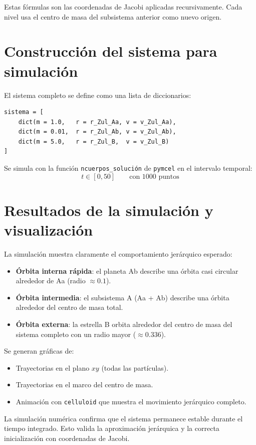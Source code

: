 \begin{importante}
Estas fórmulas son las coordenadas de Jacobi aplicadas recursivamente. Cada nivel usa el centro de masa del subsistema anterior como nuevo origen.
\end{importante}

\section{Construcción del sistema para simulación}
El sistema completo se define como una lista de diccionarios:
\begin{lstlisting}
sistema = [
    dict(m = 1.0,   r = r_Zul_Aa, v = v_Zul_Aa),
    dict(m = 0.01,  r = r_Zul_Ab, v = v_Zul_Ab),
    dict(m = 5.0,   r = r_Zul_B,  v = v_Zul_B)
]
\end{lstlisting}

Se simula con la función \texttt{ncuerpos\_solución} de \texttt{pymcel} en el intervalo temporal:
\[
t \in [0, 50]\qquad \text{con 1000 puntos}
\]

\section{Resultados de la simulación y visualización}
La simulación muestra claramente el comportamiento jerárquico esperado:
\begin{itemize}
    \item \textbf{Órbita interna rápida}: el planeta Ab describe una órbita casi circular alrededor de Aa (radio \(\approx 0.1\)).
    \item \textbf{Órbita intermedia}: el subsistema A (Aa + Ab) describe una órbita alrededor del centro de masa total.
    \item \textbf{Órbita externa}: la estrella B orbita alrededor del centro de masa del sistema completo con un radio mayor (\(\approx 0.336\)).
\end{itemize}

Se generan gráficas de:
\begin{itemize}
    \item Trayectorias en el plano \(xy\) (todas las partículas).
    \item Trayectorias en el marco del centro de masa.
    \item Animación con \texttt{celluloid} que muestra el movimiento jerárquico completo.
\end{itemize}

\begin{importante}
La simulación numérica confirma que el sistema permanece estable durante el tiempo integrado. Esto valida la aproximación jerárquica y la correcta inicialización con coordenadas de Jacobi.
\end{importante}


